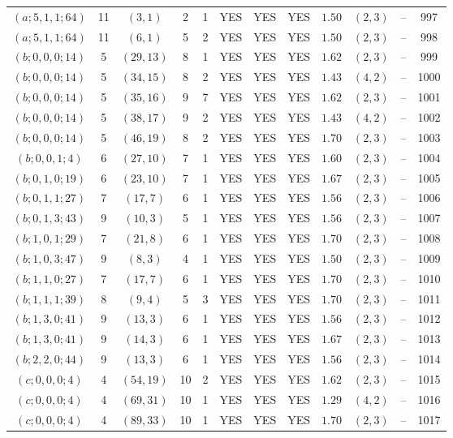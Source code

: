 \begin{longtable}{|c|c|c|c|c|c|c|c|c|c|c|c|}
$(a;5,1,1;64)$ & 11 & $(3,1)$ & 2 & 1 & YES & YES & YES & $1.50$ & $(2,3)$ & -- & 997\\
$(a;5,1,1;64)$ & 11 & $(6,1)$ & 5 & 2 & YES & YES & YES & $1.50$ & $(2,3)$ & -- & 998\\
$(b;0,0,0;14)$ & 5 & $(29,13)$ & 8 & 1 & YES & YES & YES & $1.62$ & $(2,3)$ & -- & 999\\
$(b;0,0,0;14)$ & 5 & $(34,15)$ & 8 & 2 & YES & YES & YES & $1.43$ & $(4,2)$ & -- & 1000\\
$(b;0,0,0;14)$ & 5 & $(35,16)$ & 9 & 7 & YES & YES & YES & $1.62$ & $(2,3)$ & -- & 1001\\
$(b;0,0,0;14)$ & 5 & $(38,17)$ & 9 & 2 & YES & YES & YES & $1.43$ & $(4,2)$ & -- & 1002\\
$(b;0,0,0;14)$ & 5 & $(46,19)$ & 8 & 2 & YES & YES & YES & $1.70$ & $(2,3)$ & -- & 1003\\
$(b;0,0,1;4)$ & 6 & $(27,10)$ & 7 & 1 & YES & YES & YES & $1.60$ & $(2,3)$ & -- & 1004\\
$(b;0,1,0;19)$ & 6 & $(23,10)$ & 7 & 1 & YES & YES & YES & $1.67$ & $(2,3)$ & -- & 1005\\
$(b;0,1,1;27)$ & 7 & $(17,7)$ & 6 & 1 & YES & YES & YES & $1.56$ & $(2,3)$ & -- & 1006\\
$(b;0,1,3;43)$ & 9 & $(10,3)$ & 5 & 1 & YES & YES & YES & $1.56$ & $(2,3)$ & -- & 1007\\
$(b;1,0,1;29)$ & 7 & $(21,8)$ & 6 & 1 & YES & YES & YES & $1.70$ & $(2,3)$ & -- & 1008\\
$(b;1,0,3;47)$ & 9 & $(8,3)$ & 4 & 1 & YES & YES & YES & $1.50$ & $(2,3)$ & -- & 1009\\
$(b;1,1,0;27)$ & 7 & $(17,7)$ & 6 & 1 & YES & YES & YES & $1.70$ & $(2,3)$ & -- & 1010\\
$(b;1,1,1;39)$ & 8 & $(9,4)$ & 5 & 3 & YES & YES & YES & $1.70$ & $(2,3)$ & -- & 1011\\
$(b;1,3,0;41)$ & 9 & $(13,3)$ & 6 & 1 & YES & YES & YES & $1.56$ & $(2,3)$ & -- & 1012\\
$(b;1,3,0;41)$ & 9 & $(14,3)$ & 6 & 1 & YES & YES & YES & $1.67$ & $(2,3)$ & -- & 1013\\
$(b;2,2,0;44)$ & 9 & $(13,3)$ & 6 & 1 & YES & YES & YES & $1.56$ & $(2,3)$ & -- & 1014\\
$(c;0,0,0;4)$ & 4 & $(54,19)$ & 10 & 2 & YES & YES & YES & $1.62$ & $(2,3)$ & -- & 1015\\
$(c;0,0,0;4)$ & 4 & $(69,31)$ & 10 & 1 & YES & YES & YES & $1.29$ & $(4,2)$ & -- & 1016\\
$(c;0,0,0;4)$ & 4 & $(89,33)$ & 10 & 1 & YES & YES & YES & $1.70$ & $(2,3)$ & -- & 1017\\

\end{longtable}

